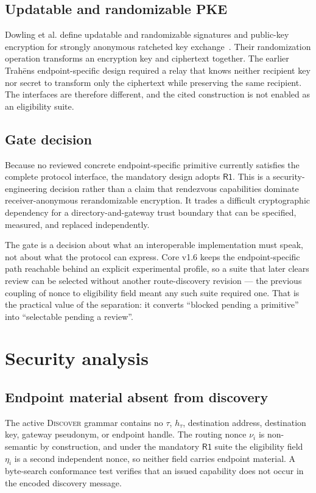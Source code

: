 \documentclass[11pt,oneside]{article}
\newcommand{\ProtoName}{Trah\={e}ns}
\newcommand{\Rone}{\ensuremath{\mathsf{R1}}}
\begin{document}
\subsection{Updatable and randomizable PKE}

Dowling et al. define updatable and randomizable signatures and public-key encryption for strongly anonymous ratcheted key exchange~\cite{urpke2022}. Their randomization operation transforms an encryption key and ciphertext together. The earlier \ProtoName{} endpoint-specific design required a relay that knows neither recipient key nor secret to transform only the ciphertext while preserving the same recipient. The interfaces are therefore different, and the cited construction is not enabled as an eligibility suite.

\subsection{Gate decision}

Because no reviewed concrete endpoint-specific primitive currently satisfies the complete protocol interface, the mandatory design adopts \Rone{}. This is a security-engineering decision rather than a claim that rendezvous capabilities dominate receiver-anonymous rerandomizable encryption. It trades a difficult cryptographic dependency for a directory-and-gateway trust boundary that can be specified, measured, and replaced independently.

The gate is a decision about what an interoperable implementation must speak, not about what the protocol can express. Core v1.6 keeps the endpoint-specific path reachable behind an explicit experimental profile, so a suite that later clears review can be selected without another route-discovery revision --- the previous coupling of nonce to eligibility field meant any such suite required one. That is the practical value of the separation: it converts ``blocked pending a primitive'' into ``selectable pending a review''.

\section{Security analysis}
\label{sec:security}

\subsection{Endpoint material absent from discovery}

The active \textsc{Discover} grammar contains no $\tau$, $h_\tau$, destination address, destination key, gateway pseudonym, or endpoint handle. The routing nonce $\nu_i$ is non-semantic by construction, and under the mandatory \Rone{} suite the eligibility field $\eta_i$ is a second independent nonce, so neither field carries endpoint material. A byte-search conformance test verifies that an issued capability does not occur in the encoded discovery message.
\end{document}

